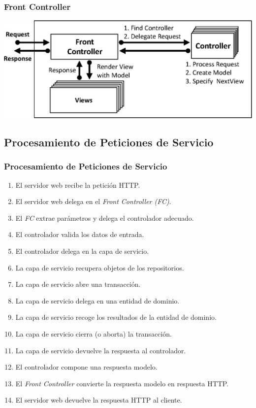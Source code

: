 \documentclass[handout,a4paper,slidestop,xcolor=pst,blue]{beamer}
\begin{document}
\begin{frame}[c]
    \frametitle{Front Controller}
    \begin{center}
        \includegraphics[width=\linewidth]{images/patterns/mvc00.eps}
    \end{center}
\end{frame}

\subsection{Procesamiento de Peticiones de Servicio}

\begin{frame}[c]
    \frametitle{Procesamiento de Peticiones de Servicio}
    \begin{enumerate}[<+->]
        \item El servidor web recibe la petición HTTP.
        \item El servidor web delega en el \emph{Front Controller (FC)}.
        \item El \emph{FC} extrae parámetros y delega el controlador adecuado.
        \item El controlador valida los datos de entrada.
        \item El controlador delega en la capa de servicio.
        \item La capa de servicio recupera objetos de los repositorios.
        \item La capa de servicio abre una transacción.
        \item La capa de servicio delega en una entidad de dominio.
        \item La capa de servicio recoge los resultados de la entidad de dominio.
        \item La capa de servicio cierra (o aborta) la transacción.
        \item La capa de servicio devuelve la respuesta al controlador.
        \item El controlador compone una respuesta modelo.
        \item El \emph{Front Controller} convierte la respuesta modelo en respuesta HTTP.
        \item El servidor web devuelve la respuesta HTTP al cliente.
    \end{enumerate}
\end{frame}
\end{document}
